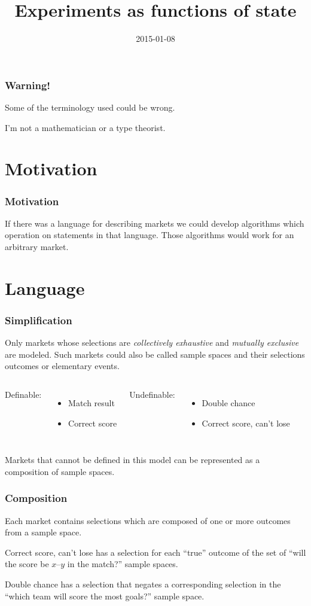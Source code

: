 \documentclass{beamer}
\title{Experiments as functions of state}
\date{2015-01-08}
\begin{document}
\begin{frame}
\titlepage
\end{frame}

\begin{frame}
\frametitle{Warning!}
Some of the terminology used could be wrong.

I'm not a mathematician or a type theorist.
\end{frame}

\section{Motivation}
\begin{frame}
\frametitle{Motivation}
If there was a language for describing markets we could develop algorithms
which operation on statements in that language.  Those algorithms would work
for an arbitrary market.
\end{frame}

\section{Language}
\begin{frame}
\frametitle{Simplification}
Only markets whose selections are \emph{collectively exhaustive} and
\emph{mutually exclusive} are modeled.  Such markets could also be called
\alert{sample spaces} and their selections \alert{outcomes} or
\alert{elementary events}.

\begin{columns}
Definable:
\begin{itemize}
\item Match result
\item Correct score
\end{itemize}
Undefinable:
\begin{itemize}
\item Double chance
\item Correct score, can't lose
\end{itemize}
\end{columns}

Markets that cannot be defined in this model can be represented as a
composition of sample spaces.
\end{frame}

\begin{frame}
\frametitle{Composition}
Each market contains selections which are composed of one or more outcomes
from a sample space.

\begin{example}
Correct score, can't lose has a selection for each ``true'' outcome of the
set of ``will the score be $x$--$y$ in the match?'' sample spaces.
\end{example}

\begin{example}
Double chance has a selection that negates a corresponding selection in the
``which team will score the most goals?'' sample space.
\end{example}
\end{frame}
\end{document}

